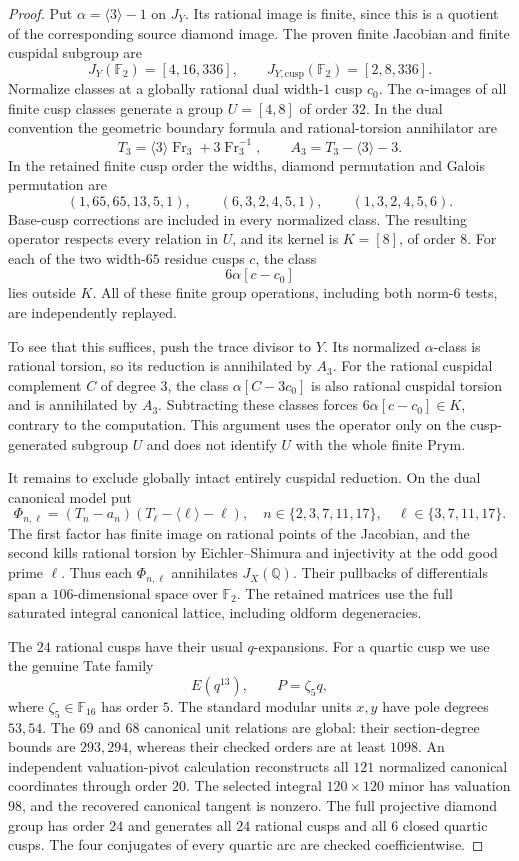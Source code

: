 \begin{proof}
Put $\alpha=\langle3\rangle-1$ on $J_Y$.
Its rational image is finite, since this is a quotient of the corresponding source diamond image.
The proven finite Jacobian and finite cuspidal subgroup are
\[
 J_Y(\mathbb F_2)=[4,16,336],\qquad J_{Y,\mathrm{cusp}}(\mathbb F_2)=[2,8,336].
\]
Normalize classes at a globally rational dual width-$1$ cusp $c_0$.
The $\alpha$-images of all finite cusp classes generate a group $U=[4,8]$ of order $32$.
In the dual convention the geometric boundary formula and rational-torsion annihilator are
\[
 T_3=\langle3\rangle\operatorname{Fr}_3+3\operatorname{Fr}_3^{-1},
 \qquad A_3=T_3-\langle3\rangle-3.
\]
In the retained finite cusp order the widths, diamond permutation and Galois permutation are
\[
 (1,65,65,13,5,1),\qquad (6,3,2,4,5,1),\qquad(1,3,2,4,5,6).
\]
Base-cusp corrections are included in every normalized class.
The resulting operator respects every relation in $U$, and its kernel is $K=[8]$, of order $8$.
For each of the two width-$65$ residue cusps $c$, the class
\[
 6\alpha[c-c_0]
\]
lies outside $K$.
All of these finite group operations, including both norm-$6$ tests, are independently replayed.

To see that this suffices, push the trace divisor to $Y$.
Its normalized $\alpha$-class is rational torsion, so its reduction is annihilated by $A_3$.
For the rational cuspidal complement $C$ of degree $3$, the class $\alpha[C-3c_0]$ is also rational cuspidal torsion and is annihilated by $A_3$.
Subtracting these classes forces $6\alpha[c-c_0]\in K$, contrary to the computation.
This argument uses the operator only on the cusp-generated subgroup $U$ and does not identify $U$ with the whole finite Prym.

It remains to exclude globally intact entirely cuspidal reduction.
On the dual canonical model put
\[
 \Phi_{n,\ell}=(T_n-a_n)(T_\ell-\langle\ell\rangle-\ell),
 \quad n\in\{2,3,7,11,17\},\quad \ell\in\{3,7,11,17\}.
\]
The first factor has finite image on rational points of the Jacobian, and the second kills rational torsion by Eichler--Shimura and injectivity at the odd good prime $\ell$.
Thus each $\Phi_{n,\ell}$ annihilates $J_X(\mathbb Q)$.
Their pullbacks of differentials span a $106$-dimensional space over $\mathbb F_2$.
The retained matrices use the full saturated integral canonical lattice, including oldform degeneracies.

The $24$ rational cusps have their usual $q$-expansions.
For a quartic cusp we use the genuine Tate family
\[
 E(q^{13}),\qquad P=\zeta_5q,
\]
where $\zeta_5\in\mathbb F_{16}$ has order $5$.
The standard modular units $x,y$ have pole degrees $53,54$.
The $69$ and $68$ canonical unit relations are global: their section-degree bounds are $293,294$, whereas their checked orders are at least $1098$.
An independent valuation-pivot calculation reconstructs all $121$ normalized canonical coordinates through order $20$.
The selected integral $120\times120$ minor has valuation $98$, and the recovered canonical tangent is nonzero.
The full projective diamond group has order $24$ and generates all $24$ rational cusps and all $6$ closed quartic cusps.
The four conjugates of every quartic arc are checked coefficientwise.


\end{proof}
